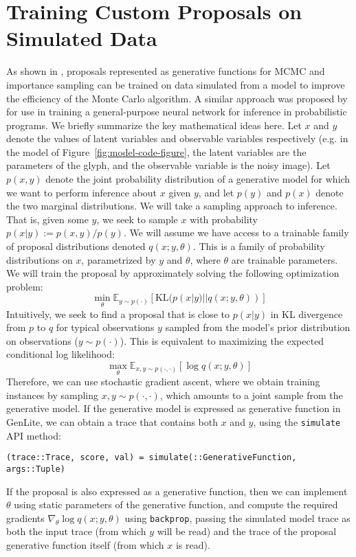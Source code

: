 \section{Training Custom Proposals on Simulated Data}


As shown in \cite{cusumano2018using}, proposals represented as generative functions for MCMC and importance sampling can be trained on data simulated from a model to improve the efficiency of the Monte Carlo algorithm.
A similar approach was proposed by \cite{le2016inference} for use in training a general-purpose neural network for inference in probabilistic programs.
We briefly summarize the key mathematical ideas here.
Let $x$ and $y$ denote the values of latent variables and observable variables respectively (e.g. in the model of Figure~\ref{fig:model-code-figure}, the latent variables are the parameters of the glyph, and the observable variable is the noisy image).
Let $p(x, y)$ denote the joint probability distribution of a generative model for which we want to perform inference about $x$ given $y$, and let $p(y)$ and $p(x)$ denote the two marginal distributions.
We will take a sampling approach to inference.
That is, given some $y$, we seek to sample $x$ with probability $p(x | y) := p(x, y) / p(y)$.
We will assume we have access to a trainable family of proposal distributions denoted $q(x; y, \theta)$.
This is a family of probability distributions on $x$, parametrized by $y$ and $\theta$, where $\theta$ are trainable parameters.
We will train the proposal by approximately solving the following optimization problem:
\[
\min_{\theta} \mathbb{E}_{y \sim p(\cdot)} \left[ \mbox{KL}(p(x | y) || q(x; y, \theta)) \right]
\]
Intuitively, we seek to find a proposal that is close to $p(x | y)$ in KL divergence from $p$ to $q$ for typical observations $y$ sampled from the model's prior distribution on observations ($y \sim p(\cdot)$).
This is equivalent to maximizing the expected conditional log likelihood:
\[
\max_{\theta} \mathbb{E}_{x, y \sim p(\cdot, \cdot)} \left[ \log q(x; y, \theta) \right]
\]
Therefore, we can use stochastic gradient ascent, where we obtain training instances by sampling $x, y \sim p(\cdot, \cdot)$, which amounts to a joint sample from the generative model.
If the generative model is expressed as generative function in GenLite, we can obtain a trace that contains both $x$ and $y$, using the \texttt{simulate} API method:
\begin{center}
    \texttt{(trace::Trace, score, val) = simulate(::GenerativeFunction, args::Tuple)}
\end{center}
If the proposal is also expressed as a generative function, then we can implement $\theta$ using static parameters of the generative function, and compute the required gradients $\nabla_{\theta} \log q(x; y, \theta)$ using \texttt{backprop}, passing the simulated model trace as both the input trace (from which $y$ will be read) and the trace of the proposal generative function itself (from which $x$ is read).

